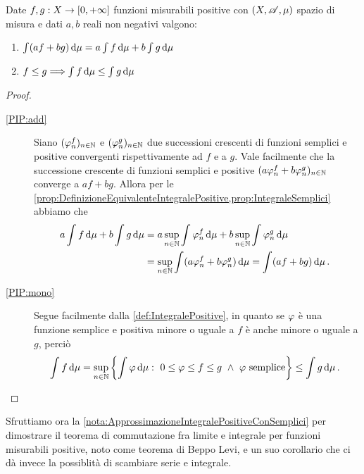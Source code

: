 \begin{proposition}\label{prop:IntegralePositive}
	Date $f,g:X\to[0,+\infty]$ funzioni misurabili positive con $(X,\mathscr A,\mu)$ spazio di misura e dati $a,b$ reali non negativi valgono:
	\begin{enumerate}
		\item $\int (af+bg)\,\mathrm d\mu=a\int f\,\mathrm d\mu+b\int g\,\mathrm d\mu$ \label{PIP:add}
		\item $f\le g\Longrightarrow \int f\,\mathrm d\mu\le \int g\,\mathrm d\mu$ \label{PIP:mono}
	\end{enumerate}
\end{proposition}
\begin{proof}
	\begin{description}
		\item[\ref{PIP:add}] Siano $(\varphi_n^f)_{n\in\mathbb N}$ e $(\varphi_n^g)_{n\in\mathbb N}$ due successioni crescenti di funzioni semplici e positive convergenti rispettivamente ad $f$ e a $g$. Vale facilmente che la successione crescente di funzioni semplici e positive $(a\varphi_n^f+b\varphi_n^g)_{n\in\mathbb N}$ converge a $af+bg$. Allora per le \cref{prop:DefinizioneEquivalenteIntegralePositive,prop:IntegraleSemplici} abbiamo che
		\begin{equation*}
		\begin{split}
			a\int f\,\mathrm d\mu+b\int g\,\mathrm d\mu&=a\sup_{n\in\mathbb N}\int \varphi_n^f\,\mathrm d\mu+b\sup_{n\in\mathbb N}\int \varphi_n^g\,\mathrm d\mu \\
			&=\sup_{n\in\mathbb N}\int (a\varphi_n^f+b\varphi_n^g)\,\mathrm d\mu=\int (af+bg)\,\mathrm d\mu\, \text{. }
		\end{split}
		\end{equation*}
		
		\item[\ref{PIP:mono}] Segue facilmente dalla \cref{def:IntegralePositive}, in quanto se $\varphi$ è una funzione semplice e positiva minore o uguale a $f$ è anche minore o uguale a $g$, perciò
		\begin{equation*}
		\int f\de\mu=\sup_{n\in\N}\left\{\int\simp\de \mu:\ 0\le \simp\le f\le g\ \wedge\ \simp \text{ semplice}\right\}\le \int g\de\mu\punto
	\end{equation*}
	\end{description}
\end{proof}

Sfruttiamo ora la \cref{nota:ApprossimazioneIntegralePositiveConSemplici} per dimostrare il teorema di commutazione fra limite e integrale per funzioni misurabili positive, noto come teorema di Beppo Levi, e un suo corollario che ci dà invece la possiblità di scambiare serie e integrale.

